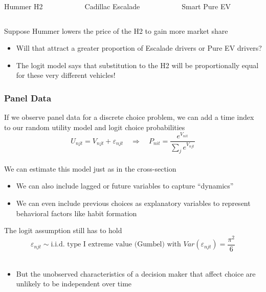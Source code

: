 \documentclass{beamer}\usepackage[]{graphicx}\usepackage[]{color}
\begin{document}
\begin{frame}
\begin{columns}
\begin{column}{0.333\textwidth}
    	\end{column}
    \end{columns}
    \begin{columns}
    	\begin{column}{0.333\textwidth}
    		\centering Hummer H2
    	\end{column}
    	\begin{column}{0.333\textwidth}
    		\centering Cadillac Escalade
    	\end{column}
    	\begin{column}{0.333\textwidth}
    		\centering Smart Pure EV
    	\end{column}
    \end{columns}
    \vspace{3ex}
    Suppose Hummer lowers the price of the H2 to gain more market share
    \begin{itemize}
    	\item Will that attract a greater proportion of Escalade drivers or Pure EV drivers?
    	\item The logit model says that substitution to the H2 will be proportionally equal for these very different vehicles!
    \end{itemize}
\end{frame}

\begin{frame}\frametitle{Panel Data}
    If we observe panel data for a discrete choice problem, we can add a time index to our random utility model and logit choice probabilities
    $$U_{njt} = V_{njt} + \varepsilon_{njt} \quad \Rightarrow \quad P_{nit} = \frac{e^{V_{nit}}}{\sum_j e^{V_{njt}}}$$ \\
    \vspace{2ex}
    We can estimate this model just as in the cross-section
    \begin{itemize}
    	\item We can also include lagged or future variables to capture ``dynamics''
    	\item We can even include previous choices as explanatory variables to represent behavioral factors like habit formation
    \end{itemize}
    \vspace{2ex}
    The logit assumption still has to hold
    $$\varepsilon_{njt} \sim \text{i.i.d.\ type I extreme value (Gumbel) with } Var(\varepsilon_{njt}) = \frac{\pi^2}{6}$$ \\
    \begin{itemize}
    	\item But the unobserved characteristics of a decision maker that affect choice are unlikely to be independent over time
    \end{itemize}
\end{frame}
\end{document}
